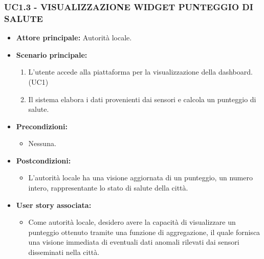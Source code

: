 \subsubsection{UC1.3 - VISUALIZZAZIONE WIDGET PUNTEGGIO DI SALUTE}
\begin{itemize}
    \item \textbf{Attore principale:} Autorità locale.
    \item \textbf{Scenario principale:}
          \begin{enumerate}
            \item L'utente accede alla piattaforma per la visualizzazione della dashboard. (UC1)
            \item Il sistema elabora i dati provenienti dai sensori e calcola un punteggio di salute.
        \end{enumerate}
    \item \textbf{Precondizioni:}
          \begin{itemize}
              \item Nessuna.
          \end{itemize}
    \item \textbf{Postcondizioni:}
          \begin{itemize}
              \item      L'autorità locale ha una visione aggiornata di un punteggio, un numero intero, rappresentante lo stato di salute della città.
          \end{itemize}
    \item \textbf{User story associata:}
          \begin{itemize}
              \item Come autorità locale, desidero avere la capacità di visualizzare un punteggio ottenuto tramite una funzione di aggregazione, il quale fornisca una visione immediata di eventuali dati anomali rilevati dai sensori disseminati nella città.
          \end{itemize}
\end{itemize}